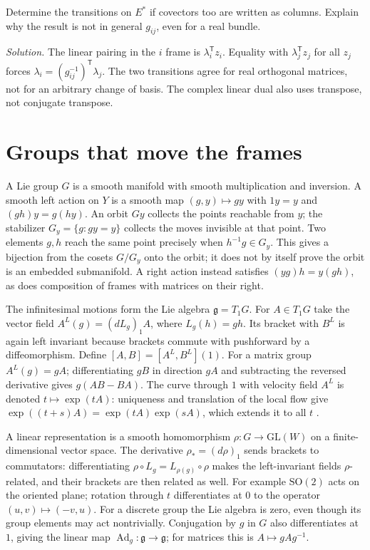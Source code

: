 \begin{exercise}
Determine the transitions on $E^*$ if covectors too are written as columns. Explain why the result is not in general $g_{ij}$, even for a real bundle.

\emph{Solution.} The linear pairing in the $i$ frame is $\lambda_i^{\mathsf T}z_i$. Equality with $\lambda_j^{\mathsf T}z_j$ for all $z_j$ forces $\lambda_i=(g_{ij}^{-1})^{\mathsf T}\lambda_j$. The two transitions agree for real orthogonal matrices, not for an arbitrary change of basis. The complex linear dual also uses transpose, not conjugate transpose.
\end{exercise}

\section{Groups that move the frames}\label{f:group-action}

A Lie group $G$ is a smooth manifold with smooth multiplication and inversion. A smooth left action on $Y$ is a smooth map $(g,y)\mapsto g y$ with $1y=y$ and $(gh)y=g(hy)$. An orbit $G y$ collects the points reachable from $y$; the stabilizer $G_y=\{g:g y=y\}$ collects the moves invisible at that point. Two elements $g,h$ reach the same point precisely when $h^{-1}g\in G_y$. This gives a bijection from the cosets $G/G_y$ onto the orbit; it does not by itself prove the orbit is an embedded submanifold. A right action instead satisfies $(y g)h=y(gh)$, as does composition of frames with matrices on their right.

The infinitesimal motions form the Lie algebra $\mathfrak g=T_1G$. For $A\in T_1G$ take the vector field $A^L(g)=(dL_g)_1A$, where $L_g(h)=gh$. Its bracket with $B^L$ is again left invariant because brackets commute with pushforward by a diffeomorphism. Define $[A,B]=[A^L,B^L](1)$. For a matrix group $A^L(g)=gA$; differentiating $gB$ in direction $gA$ and subtracting the reversed derivative gives $g(AB-BA)$. The curve through $1$ with velocity field $A^L$ is denoted $t\mapsto\exp(tA)$: uniqueness and translation of the local flow give $\exp((t+s)A)=\exp(tA)\exp(sA)$, which extends it to all $t$ \cite{LeeSM}.

A linear representation is a smooth homomorphism $\rho:G\to\mathrm{GL}(W)$ on a finite-dimensional vector space. The derivative $\rho_*=(d\rho)_1$ sends brackets to commutators: differentiating $\rho\circ L_g=L_{\rho(g)}\circ\rho$ makes the left-invariant fields $\rho$-related, and their brackets are then related as well. For example $\mathrm{SO}(2)$ acts on the oriented plane; rotation through $t$ differentiates at $0$ to the operator $(u,v)\mapsto(-v,u)$. For a discrete group the Lie algebra is zero, even though its group elements may act nontrivially. Conjugation by $g$ in $G$ also differentiates at $1$, giving the linear map $\operatorname{Ad}_g:\mathfrak g\to\mathfrak g$; for matrices this is $A\mapsto gAg^{-1}$.


